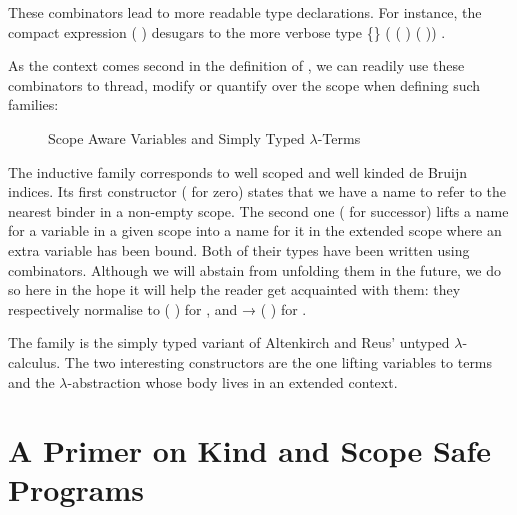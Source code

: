 These combinators lead to more readable type declarations. For instance,
the compact expression
\AF{[}   (  )   \AF{]}
desugars to the more verbose type
 \{\}  ( ( )   ( ))   .

As the context comes second in the definition of , we
can readily use these combinators to thread, modify or quantify over the
scope when defining such families:

\begin{figure}[h]
\begin{minipage}{0.35\textwidth}
\end{minipage}
\begin{minipage}{0.55\textwidth}
\end{minipage}
\caption{Scope Aware Variables and Simply Typed $\lambda$-Terms\label{scoped-untyped}}
\end{figure}

The inductive family  corresponds to well scoped and well kinded
de Bruijn~\citeyear{de1972lambda}
indices. Its first constructor ( for zero) states that we have a name to refer to
the nearest binder in a non-empty scope. The second one ( for successor) lifts a
name for a variable in a given scope into a name for it in the extended scope where
an extra variable has been bound. Both of their types have been written using combinators.
Although we will abstain from unfolding them in the future, we do so here in the hope
it will help the reader get acquainted with them: they respectively normalise to
{      ( \AIC{:\!:} )} for ,
and {    →       ( \AIC{:\!:} )} for .

The   family  is the simply typed variant of Altenkirch
and Reus' untyped $\lambda$-calculus. The two interesting constructors are the one
lifting variables to terms and the $\lambda$-abstraction whose body lives in an
extended context.




\section{A Primer on Kind and Scope Safe Programs}\label{section:primer-program}

